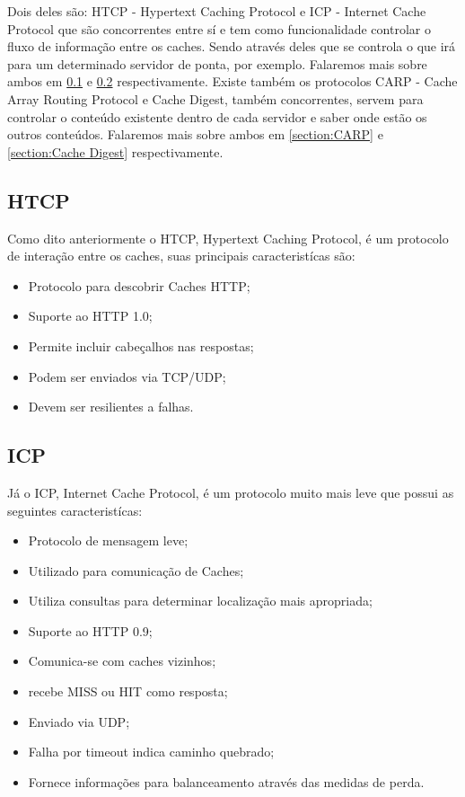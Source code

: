 Dois deles s\~ao: HTCP - Hypertext Caching Protocol e ICP - Internet Cache Protocol que s\~ao concorrentes entre s\'i e tem como funcionalidade controlar o fluxo de informa\c{c}\~ao entre os caches. Sendo atrav\'es deles que se controla o que ir\'a para um determinado servidor de ponta, por exemplo. Falaremos mais sobre ambos em \ref{section:HTCP} e \ref{section:ICP} respectivamente.
 Existe tamb\'em os protocolos CARP -  Cache Array Routing Protocol e Cache Digest, tamb\'em concorrentes, servem para controlar o conte\'udo existente dentro de cada servidor e saber onde est\~ao os outros conte\'udos. Falaremos mais sobre ambos em \ref{section:CARP} e \ref{section:Cache Digest} respectivamente.

\subsection{HTCP}
\label{section:HTCP}
Como dito anteriormente o HTCP, Hypertext Caching Protocol, \'e um protocolo de intera\c{c}\~ao entre os caches, suas principais caracterist\'icas s\~ao:
\begin{itemize}
\item Protocolo para descobrir Caches HTTP;
\item Suporte ao HTTP 1.0;
\item Permite incluir cabeçalhos nas respostas;
\item Podem ser enviados via TCP/UDP;
\item Devem ser resilientes a falhas.
\end{itemize}

\subsection{ICP}
\label{section:ICP}
J\'a o ICP, Internet Cache Protocol, \'e um protocolo muito mais leve que possui as seguintes caracterist\'icas:
\begin{itemize}
\item Protocolo de mensagem leve;
\item Utilizado para comunica\c{c}\~ao de Caches;
\item Utiliza consultas para determinar localiza\c{c}\~ao mais apropriada;
\item Suporte ao HTTP 0.9;
\item Comunica-se com caches vizinhos;
\item recebe MISS ou HIT como resposta;
\item Enviado via UDP;
\item Falha por timeout indica caminho quebrado;
\item Fornece informa\c{c}\~oes para balanceamento atrav\'es das medidas de perda.
\end{itemize}

